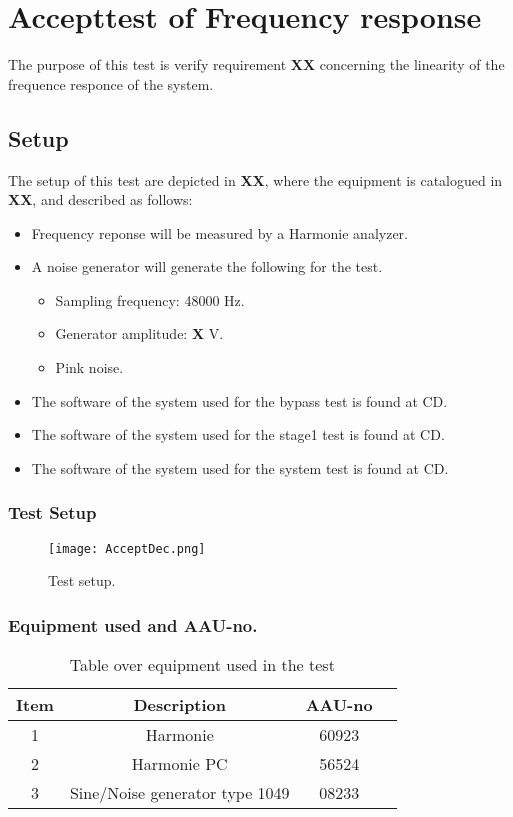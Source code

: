 \chapter{Accepttest of Frequency response}\label{app:journal_Frequency_Response}
The purpose of this test is verify requirement \textbf{XX} concerning the linearity of the frequence responce of the system.

\section{Setup}
The setup of this test are depicted in \textbf{XX}, where the equipment is catalogued in \textbf{XX}, and described as follows:

\begin{itemize}
\item Frequency reponse will be measured by a Harmonie analyzer.
\item A noise generator will generate the following for the test. 
\begin{itemize}
\item Sampling frequency: 48000 Hz.
\item Generator amplitude: \textbf{X} V.
\item Pink noise.
\end{itemize}
\item The software of the system used for the bypass test is found at CD. 
\item The software of the system used for the stage1 test is found at CD. 
\item The software of the system used for the system test is found at CD. 
\end{itemize}


\subsection*{Test Setup}
\begin{figure}[H]
\centering
\texttt{[image: AcceptDec.png]}
\label{fig:AcceptDec}
\caption{Test setup.}
\end{figure}

\subsection*{Equipment used and AAU-no.}

\begin{table}[H]
\centering
{}
\begin{tabular}{S[table-format=1]ccc} \toprule
    {Item} & {Description} & {AAU-no} \\       &  Harmonie  & 60923  \\ 
    2      &  Harmonie PC  & 56524  \\ 
    3      &  Sine/Noise generator type 1049  & 08233  \\  \bottomrule 
\end{tabular}
\caption{Table over equipment used in the test}
\label{tab:UsedEquipmentFreqResponse}
\end{table}
\vspace{-5mm}


